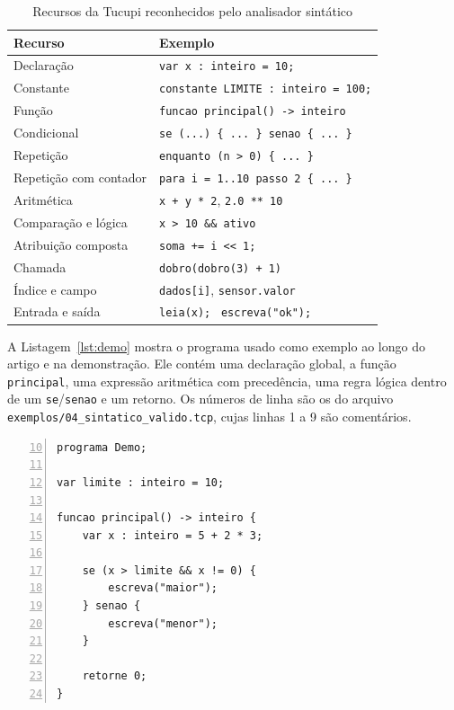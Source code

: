 \documentclass[conference,a4paper]{IEEEtran}
\newcommand{\cod}[1]{\texttt{#1}}
\begin{document}
\begin{table}[t]
\caption{Recursos da Tucupi reconhecidos pelo analisador sintático}
\label{tab:recursos}
\centering
\footnotesize
\begin{tabular}{@{}ll@{}}
\toprule
Recurso & Exemplo \\
\midrule
Declaração & \cod{var x : inteiro = 10;} \\
Constante & \cod{constante LIMITE : inteiro = 100;} \\
Função & \cod{funcao principal() -> inteiro} \\
Condicional & \cod{se (...) \{ ... \} senao \{ ... \}} \\
Repetição & \cod{enquanto (n > 0) \{ ... \}} \\
Repetição com contador & \cod{para i = 1..10 passo 2 \{ ... \}} \\
Aritmética & \cod{x + y * 2}, \cod{2.0 ** 10} \\
Comparação e lógica & \cod{x > 10 \&\& ativo} \\
Atribuição composta & \cod{soma += i << 1;} \\
Chamada & \cod{dobro(dobro(3) + 1)} \\
Índice e campo & \cod{dados[i]}, \cod{sensor.valor} \\
Entrada e saída & \cod{leia(x);}~ \cod{escreva("ok");} \\
\bottomrule
\end{tabular}
\end{table}

A Listagem~\ref{lst:demo} mostra o programa usado como exemplo ao longo do artigo e na demonstração. Ele contém uma declaração global, a função \cod{principal}, uma expressão aritmética com precedência, uma regra lógica dentro de um \cod{se}/\cod{senao} e um retorno. Os números de linha são os do arquivo \cod{exemplos/04\_sintatico\_valido.tcp}, cujas linhas 1 a 9 são comentários.

\begin{lstlisting}[float=tb,style=tucupi,caption={Programa de exemplo (linhas 10--24 do arquivo)},label={lst:demo},numbers=left,firstnumber=10,numberstyle=\tiny\color{cinza},numbersep=4pt,xleftmargin=12pt]
programa Demo;

var limite : inteiro = 10;

funcao principal() -> inteiro {
    var x : inteiro = 5 + 2 * 3;

    se (x > limite && x != 0) {
        escreva("maior");
    } senao {
        escreva("menor");
    }

    retorne 0;
}
\end{lstlisting}
\end{document}
